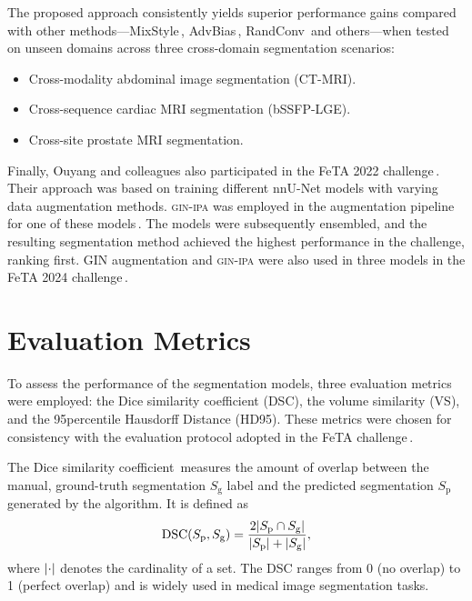The proposed approach consistently yields superior performance gains compared with other methods---MixStyle\,\cite{Zhou2021}, AdvBias\,\cite{Chen2020}, RandConv\,\cite{Xu2021} and others---when tested on unseen domains across three cross-domain segmentation scenarios:
\begin{itemize}
    \item Cross-modality abdominal image segmentation (CT-MRI).
    \item Cross-sequence cardiac MRI segmentation (bSSFP-LGE).
    \item Cross-site prostate MRI segmentation.
\end{itemize}

Finally, Ouyang and colleagues also participated in the FeTA 2022 challenge\,\cite{FeTA2022_review}. Their approach was based on training different nnU-Net models with varying data augmentation methods. \textsc{gin-ipa} was employed in the augmentation pipeline for one of these models\,\cite{FeTA2022_top}. The models were subsequently ensembled, and the resulting segmentation method achieved the highest performance in the challenge, ranking first. GIN augmentation and \textsc{gin-ipa} were also used in three models in the FeTA 2024 challenge\,\cite{FeTA2024_review}.

\section{Evaluation Metrics}
To assess the performance of the segmentation models, three evaluation metrics were employed: the Dice similarity coefficient (DSC), the volume similarity (VS), and the 95\th percentile Hausdorff Distance (HD95). These metrics were chosen for consistency with the evaluation protocol adopted in the FeTA challenge\,\cite{FeTA2021_review}.

The Dice similarity coefficient\,\cite{Dice1945,FeTA2021_review} measures the amount of overlap between the manual, ground-truth segmentation $S_\text{g}$ label and the predicted segmentation $S_\text{p}$ generated by the algorithm. It is defined as
\begin{equation}
    \text{DSC}(S_\text{p}, S_\text{g}) = \frac{2 \lvert S_\text{p} \cap S_\text{g}\rvert}{\lvert S_\text{p}\rvert + \lvert S_\text{g}\rvert},
\end{equation}
where $\lvert\cdot\rvert$ denotes the cardinality of a set. The DSC ranges from \num{0} (no overlap) to \num{1} (perfect overlap) and is widely used in medical image segmentation tasks.

